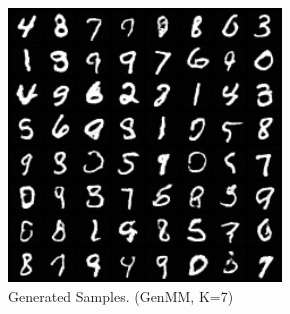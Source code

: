 \begin{figure}[!ht]
  \captionsetup[subfigure]{justification=centering}
  \centering
  \begin{subfigure}[b]{0.24\textwidth}
    \centering
    \includegraphics[width=1\linewidth]{images/mnist/samples/genMNIST_GenMM_K7_std089.png}
    \caption{Generated Samples. (GenMM, K=7)}
  \end{subfigure}
  \centering
  \begin{subfigure}[b]{0.24\textwidth}
    \centering

\end{subfigure}
\end{figure}
